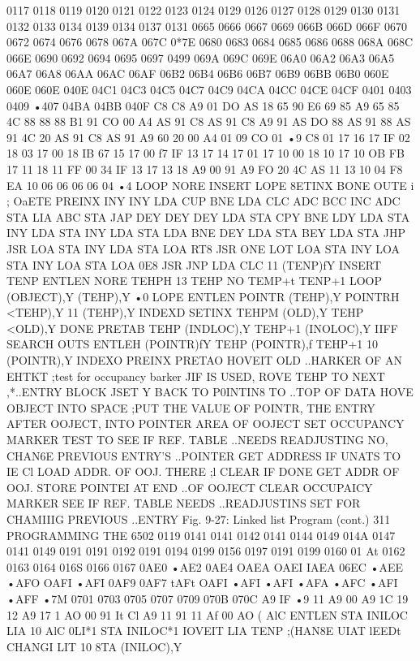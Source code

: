 {{{{{{{{{0117
0118
0119
0120
0121
0122
0123
0124
0129
0126
0127
0128
0129
0130
0131
0132
0133
0134
0139
0134
0137
0131
0665
0666
0667
0669
066B
066D
066F
0670
0672
0674
0676
0678
067A
067C
0*7E
0680
0683
0684
0685
0686
0688
068A
068C
066E
0690
0692
0694
0695
0697
0499
069A
069C
069E
06A0
06A2
06A3
06A5
06A7
06A8
06AA
06AC
06AF
06B2
06B4
06B6
06B7
06B9
06BB
06B0
060E
060E
060E
040E
04C1
04C3
04C5
04C7
04C9
04CA
04CC
04CE
04CF
0401
0403
0409
•407
04BA
04BB
040F
C8
C8
A9
01
DO
AS
18
65
90
E6
69
85
A9
65
85
4C
88
88
88
B1
91
CO
00
A4
AS
91
C8
AS
91
C8
A9
91
AS
DO
88
AS
91
88
AS
91
4C
20
AS
91
C8
AS
91
A9
60
20
00
A4
01
09
CO
01
•9
C8
01
17
16
17
IF
02
18
03
17
00
18
IB
67
15
17
00
f7
IF
13
17
14
17
01
17
10
00
18
10
17
10
OB
FB
17
11
18
11
FF
00
34
IF
13
17
13
18
A9 00
91
A9
FO
20
4C
AS
11
13
10
04
F8
EA
10
06
06
06
06
04
•4
LOOP
NORE
INSERT
LOPE
8ETINX
BONE
OUTE
i
;
OaETE
PREINX
INY
INY
LDA
CUP
BNE
LDA
CLC
ADC
BCC
INC
ADC
STA
LIA
ABC
STA
JAP
DEY
DEY
DEY
LDA
STA
CPY
BNE
LDY
LDA
STA
INY
LDA
STA
INY
LDA
STA
LDA
BNE
DEY
LDA
STA
BEY
LDA
STA
JHP
JSR
LOA
STA
INY
LDA
STA
LOA
RT8
JSR
ONE
LOT
LOA
STA
INY
LOA
STA
INY
LOA
STA
LOA
0E8
JSR
JNP
LDA
CLC
11
(TENP)fY
INSERT
TENP
ENTLEN
NORE
TEHPH
13
TEHP
NO
TEMP+t
TENP+1
LOOP
(OBJECT),Y
(TEHP),Y
•0
LOPE
ENTLEN
POINTR
(TEHP),Y
POINTRH
<TEHP),Y
11
(TEHP),Y
INDEXD
SETINX
TEHPM
(OLD),Y
TEHP
<OLD),Y
DONE
PRETAB
TEHP
(INDLOC),Y
TEHP+1
(INOLOC),Y
IIFF
SEARCH
OUTS
ENTLEH
(POINTR)fY
TEHP
(POINTR),f
TEHP+1
10
(POINTR),Y
INDEXO
PREINX
PRETAO
HOVEIT
OLD
{..HARKER OF AN EHTKT
;test for occupancy barker
JIF IS USED, ROVE TEHP TO NEXT
,*..ENTRY BLOCK
JSET Y BACK TO P0INTIN8 TO
{..TOP OF DATA
{HOVE OBJECT INTO SPACE
;PUT THE VALUE OF POINTR, THE
{ENTRY AFTER OOJECT, INTO
{POINTER AREA OF OOJECT
{SET OCCUPANCY MARKER
{TEST TO SEE IF REF. TABLE
{..NEEDS READJUSTING
{NO, CHAN6E PREVIOUS ENTRY'S
{..POINTER
{GET ADDRESS IF UNATS TO IE Cl
{LOAD ADDR. OF OOJ. THERE
;l CLEAR IF DONE
{GET ADDR OF OOJ.
{STORE POINTEI AT END
{..OF OOJECT
{CLEAR OCCUPAICY MARKER
{SEE IF REF. TABLE NEEDS
{..READJUSTINS
{SET FOR CHAMIIIG PREVIOUS
{..ENTRY
Fig. 9-27: Linked list Program (cont.)
311
PROGRAMMING THE 6502
0119
0141
0141
0142
0141
0144
0149
014A
0147
0141
0149
0191
0191
0192
0191
0194
0199
0156
0197
0191
0199
0160
01 At
0162
0163
0164
016S
0166
0167
0AE0
•AE2
0AE4
OAEA
OAEI
IAEA
06EC
•AEE
•AFO
OAFI
•AFI
0AF9
0AF7
tAFt
OAFI
•AFI
•AFI
•AFA
•AFC
•AFI
•AFF
•7M
0701
0703
0705
0707
0709
070B
070C
A9 IF
•9 11
A9 00
A9 1C
19 12
A9 17 1
AO 00
91 It
Cl
A9 11
91 11
Af 00
AO (
AlC ENTLEN
STA INILOC
LIA 10
AlC 0LI*1
STA INILOC*1
IOVEIT LIA TENP ;(HAN8E UIAT lEEDt CHANGI
LIT 10
8TA (INILOC),Y
}}}}}}}}}}}}}}}}}}}}}}}}}}}}}
